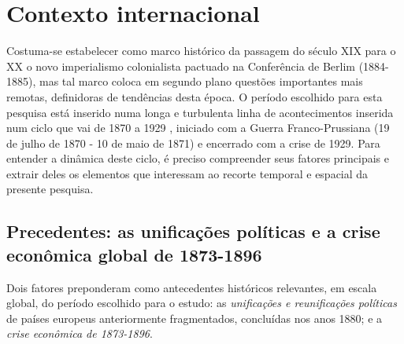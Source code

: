 \section{Contexto internacional}\label{sec:1.1}

Costuma-se estabelecer como marco histórico da passagem do século XIX para o XX o novo imperialismo colonialista pactuado na Conferência de Berlim (1884-1885), mas tal marco coloca em segundo plano questões importantes mais remotas, definidoras de tendências desta época. O período escolhido para esta pesquisa está inserido numa longa e turbulenta linha de acontecimentos inserida num ciclo que vai de 1870 a 1929 \cite{bernardo_fascismo_2003,bukharin_imperialismo_1986,
hobsbawm_empire_1989,hobsbawm_extremes_1995,hobson_imperialism_1902,
hobson_capitmoderno_1983,KROPOTKIN1901,lenin_imperialismo_1987,luxemburg_acumula_1985,
morris_magnatas_2010}, iniciado com a Guerra Franco-Prussiana (19 de julho de 1870 - 10 de maio de 1871) e encerrado com a crise de 1929. Para entender a dinâmica deste ciclo, é preciso compreender seus fatores principais e extrair deles os elementos que interessam ao recorte temporal e espacial da presente pesquisa. 

\subsection{Precedentes: as unificações políticas e a crise econômica global de 1873-1896}

Dois fatores preponderam como antecedentes históricos relevantes, em escala global, do período escolhido para o estudo: as \textit{unificações e reunificações políticas} de países europeus anteriormente fragmentados, concluídas nos anos 1880; e a \textit{crise econômica de 1873-1896}.

